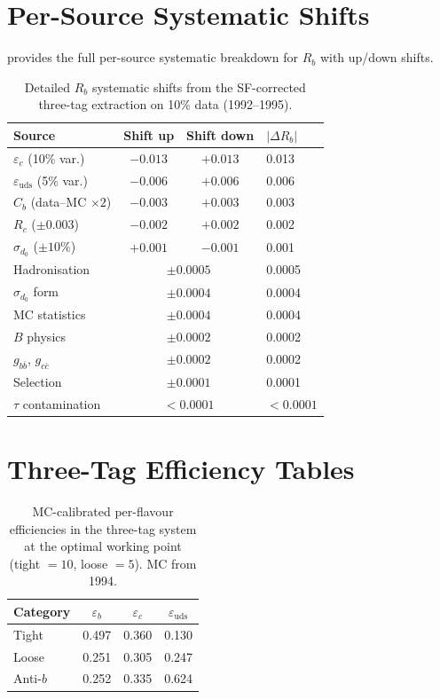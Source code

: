 \documentclass[11pt,a4paper]{article}
\begin{document}
\section{Per-Source Systematic Shifts}
\label{app:syst-tables}

 provides the full per-source
systematic breakdown for $R_b$ with up/down shifts.

\begin{table}[htbp]
\centering
\caption{Detailed $R_b$ systematic shifts from the SF-corrected
three-tag extraction on 10\% data (1992--1995).}
\label{tbl:syst_shifts_rb_detail}
\begin{tabular}{lccl}
\toprule
Source & Shift up & Shift down & $|\Delta R_b|$ \\
\midrule
$\varepsilon_c$ (10\% var.) & $-0.013$ & $+0.013$ & 0.013 \\
$\varepsilon_\text{uds}$ (5\% var.) & $-0.006$ & $+0.006$ & 0.006 \\
$C_b$ (data--MC $\times 2$) & $-0.003$ & $+0.003$ & 0.003 \\
$R_c$ ($\pm 0.003$) & $-0.002$ & $+0.002$ & 0.002 \\
$\sigma_{d_0}$ ($\pm 10\%$) & $+0.001$ & $-0.001$ & 0.001 \\
Hadronisation & \multicolumn{2}{c}{$\pm 0.0005$} & 0.0005 \\
$\sigma_{d_0}$ form & \multicolumn{2}{c}{$\pm 0.0004$} & 0.0004 \\
MC statistics & \multicolumn{2}{c}{$\pm 0.0004$} & 0.0004 \\
$B$ physics & \multicolumn{2}{c}{$\pm 0.0002$} & 0.0002 \\
$g_{b\bar{b}}$, $g_{c\bar{c}}$ & \multicolumn{2}{c}{$\pm 0.0002$} & 0.0002 \\
Selection & \multicolumn{2}{c}{$\pm 0.0001$} & 0.0001 \\
$\tau$ contamination & \multicolumn{2}{c}{$< 0.0001$} & $<0.0001$ \\
\bottomrule
\end{tabular}
\end{table}

\section{Three-Tag Efficiency Tables}
\label{app:efficiency}

\begin{table}[htbp]
\centering
\caption{MC-calibrated per-flavour efficiencies in the three-tag
system at the optimal working point (tight $= 10$, loose $= 5$).
MC from 1994.}
\label{tbl:efficiencies}
\begin{tabular}{lccc}
\toprule
Category & $\varepsilon_b$ & $\varepsilon_c$ &
  $\varepsilon_\text{uds}$ \\
\midrule
Tight & 0.497 & 0.360 & 0.130 \\
Loose & 0.251 & 0.305 & 0.247 \\
Anti-$b$ & 0.252 & 0.335 & 0.624 \\
\bottomrule
\end{tabular}
\end{table}
\end{document}
